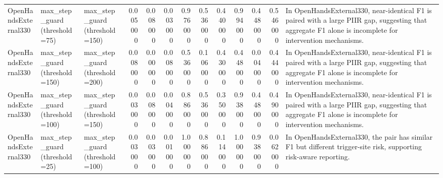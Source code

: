 \begin{table}
\begin{tabular}{lllrrrrrrrrrl}
OpenHandsExternal330 & max\_step\_guard (threshold=75) & max\_step\_guard (threshold=150) & 0.005000 & 0.008000 & 0.003000 & 0.976000 & 0.536000 & 0.440000 & 0.994000 & 0.448000 & 0.546000 & In OpenHandsExternal330, near-identical F1 is paired with a large PIIR gap, suggesting that aggregate F1 alone is incomplete for intervention mechanisms. \\
OpenHandsExternal330 & max\_step\_guard (threshold=150) & max\_step\_guard (threshold=200) & 0.008000 & 0.000000 & 0.008000 & 0.536000 & 0.106000 & 0.430000 & 0.448000 & 0.004000 & 0.444000 & In OpenHandsExternal330, near-identical F1 is paired with a large PIIR gap, suggesting that aggregate F1 alone is incomplete for intervention mechanisms. \\
OpenHandsExternal330 & max\_step\_guard (threshold=100) & max\_step\_guard (threshold=150) & 0.003000 & 0.008000 & 0.004000 & 0.886000 & 0.536000 & 0.350000 & 0.938000 & 0.448000 & 0.490000 & In OpenHandsExternal330, near-identical F1 is paired with a large PIIR gap, suggesting that aggregate F1 alone is incomplete for intervention mechanisms. \\
OpenHandsExternal330 & max\_step\_guard (threshold=25) & max\_step\_guard (threshold=100) & 0.003000 & 0.003000 & 0.001000 & 1.000000 & 0.886000 & 0.114000 & 1.000000 & 0.938000 & 0.062000 & In OpenHandsExternal330, the pair has similar F1 but different trigger-site risk, supporting risk-aware reporting. \\
\bottomrule
\end{tabular}
\end{table}
